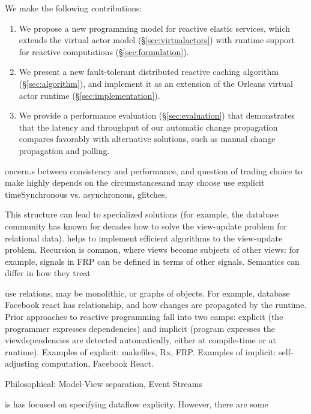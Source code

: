  We make the following contributions:
\begin{enumerate}
\item We propose a new programming model for reactive elastic services, which extends the virtual actor model (\S\ref{sec:virtualactors}) with runtime support for reactive computations (\S\ref{sec:formulation}). 
\item We present a new fault-tolerant distributed reactive caching algorithm (\S\ref{sec:algorithm}), and implement it as an extension of the Orleans virtual actor runtime (\S\ref{sec:implementation}).
\item We provide a performance evaluation (\S\ref{sec:evaluation}) that demonstrates that the latency and throughput of our automatic change propagation compares favorably with alternative solutions, such as manual change propagation and polling.
\end{enumerate}    
   
\hidden
{
oncern.s between consistency and performance, and question of trading  choice to make highly depends on the circumstancesand may choose use explicit timeSynchronous vs. asynchronous, glitches, 
 
This structure can lead to specialized solutions (for example, the database community has known for decades how to solve the view-update problem for relational data). helps to implement efficient algorithms  to the view-update problem. Recursion is common, where views become subjects of other views: for example, signals in FRP can be defined in terms of other signals. Semantics can differ in how they treat 


use relations, may be monolithic, or graphs of objects. For example, database Facebook react has 
relationship, and how changes are propagated by the runtime. Prior approaches to reactive programming fall into two camps: explicit (the programmer expresses dependencies) and implicit (program expresses the viewdependencies are detected automatically, either at compile-time or at runtime).
Examples of explicit: makefiles, Rx, FRP. Examples of implicit: self-adjusting computation, Facebook React.

Philosophical: Model-View separation, Event Streams

  is has focused on specifying dataflow explicity. However, there are some 
}

